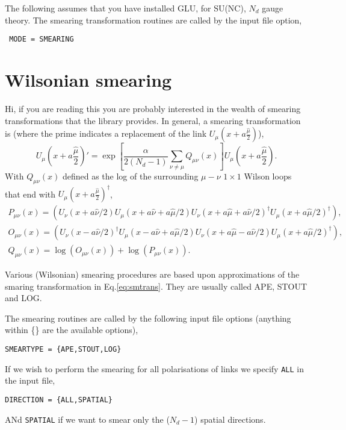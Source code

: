 \documentclass[12pt]{article}
\newcommand{\UMP}{\mbox{$U_\mu\left(x+a\frac{\hat\mu}{2}\right)$}}
\begin{document}
The following assumes that you have installed GLU, for SU(NC), $N_d$ gauge theory. The smearing transformation routines are called by the input file option,
\begin{verbatim}
 MODE = SMEARING
\end{verbatim}

\section{Wilsonian smearing}

Hi, if you are reading this you are probably interested in the wealth of smearing transformations that the library provides. In general, a smearing transformation is (where the prime indicates a replacement of the link $\UMP$),
\begin{equation}\label{eq:smtrans}
\UMP' =
\exp{\left[\frac{\alpha}{2(N_d-1)}\sum_{\nu\neq\mu}Q_{\mu\nu}(x)\right]} \UMP.
\end{equation}
With $Q_{\mu\nu}(x)$ defined as the log of the surrounding $\mu-\nu$ $1\times1$ Wilson loops that end with $\UMP^{\dagger}$,
\begin{equation}\begin{gathered}
P_{\mu\nu}(x)=\left(U_\nu(x+a\hat{\nu}/2)U_\mu(x+a\hat{\nu}+a\hat{\mu}
/2)U_\nu(x+a\hat{\mu}+a\hat{\nu}/2)^\dagger U_\mu(x+a\hat{\mu}/2)^\dagger\right) , \\
O_{\mu\nu}(x)=\left(U_\nu(x-a\hat{\nu}/2)^{\dagger}U_\mu(x-a\hat{\nu}+a\hat{\mu}
/2)U_\nu(x+a\hat{\mu}-a\hat{\nu}/2)U_\mu(x+a\hat{\mu}/2)^\dagger\right), \\
Q_{\mu\nu}(x) = \log(O_{\mu\nu}(x)) + \log(P_{\mu\nu}(x)).
\end{gathered}\end{equation}

Various (Wilsonian) smearing procedures are based upon approximations of the smaring transformation in Eq.\ref{eq:smtrans}. They are usually called APE, STOUT and LOG.

The smearing routines are called by the following input file options (anything within \{\} are the available options),
\begin{verbatim}
SMEARTYPE = {APE,STOUT,LOG}
\end{verbatim}

If we wish to perform the smearing for all polarisations of links we specify \verb|ALL| in the input file,
\begin{verbatim}
DIRECTION = {ALL,SPATIAL}
\end{verbatim}
ANd \verb|SPATIAL| if we want to smear only the ($N_d-1$) spatial directions.
\end{document}

